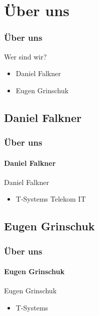 \documentclass[xcolor=dvipsnames]{beamer}
\subtitle{Modul INT02} %
\institute{AKAD Pinneberg + Stuttgart} %
\title{\Title}
\author{\Author}
\date{\today}
\begin{document}
\begin{frame}
    \titlepage
\end{frame}


\frame{\tableofcontents[hideothersubsections]} 


\section{Über uns}
\begin{frame} %
  \frametitle{Über uns} %
  \begin{block}{Wer sind wir?}
	  \begin{itemize}
  		\item Daniel Falkner
	  	\item Eugen Grinschuk
	  \end{itemize}
  \end{block}
\end{frame}

\subsection{Daniel Falkner}
\begin{frame} %
  \frametitle{Über uns} %
  \framesubtitle{Daniel Falkner} %
  \begin{block}{Daniel Falkner}
	  \begin{itemize}
  		\item T-Systems Telekom IT
	  \end{itemize}
  \end{block}
\end{frame}

\subsection{Eugen Grinschuk}
\begin{frame} %
  \frametitle{Über uns} %
  \framesubtitle{Eugen Grinschuk} %
  \begin{block}{Eugen Grinschuk}
	  \begin{itemize}
  		\item T-Systems
	  \end{itemize}
  \end{block}
\end{frame}
\end{document}
